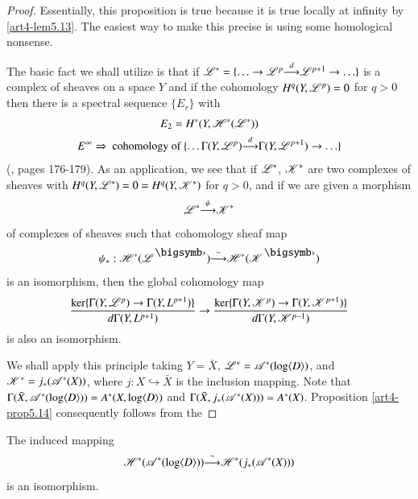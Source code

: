 \begin{proof}
Essentially, this proposition is true because it is true locally at infinity by  \eqref{art4-lem5.13}. The easiest way to make this precise is using some homological nonsense.

The basic fact we shall utilize is that if $\mathscr{L}^\ast = \{\ldots \to \mathscr{L}^p {\displaystyle{\mathop{\longrightarrow}^d}} \mathscr{L}^{p+1} \to \ldots \}$ is a complex of sheaves on a space $Y$ and if the cohomology $H^q (Y, \mathscr{L}^p) =0$ for $q > 0$ then there is a spectral sequence $\{E_r\}$ with 
\begin{gather*}
E_2 = H^\ast (Y, \mathscr{H}^\ast (\mathscr{L}^\ast))\\
E^\infty \Rightarrow \text{ cohomology of } \{\ldots \Gamma (Y, \mathscr{L}^p) {\displaystyle{\mathop{\longrightarrow}^{d}}} \Gamma (Y, \mathscr{L}^{p+1}) \to \ldots  \}
\end{gather*}\pageoriginale
(\cf \cite{art4-key17}, pages 176-179). As an application, we see that if $\mathscr{L}^\ast$, $\mathscr{K}^\ast$ are two complexes of sheaves with $H^q (Y, \mathscr{L}^\ast) = 0 = H^q (Y, \mathscr{K}^\ast)$ for $q >0$, and if we are given a morphism
$$
\mathscr{L}^\ast {\displaystyle{\mathop{\longrightarrow}^{\psi}}} \mathscr{K}^\ast
$$
of complexes of sheaves such that cohomology sheaf map
$$
\psi_\ast : \sH^\ast (\sL^\bigdot) {\displaystyle{\mathop{\longrightarrow}^{\sim}}} \sH^\ast (\sK^\bigdot)
$$
is an isomorphism, then the global cohomology map
$$
\frac{\ker \{\Gamma (Y, \mathscr{L}^p) \to \Gamma (Y, L^{p+1})\}}{d \Gamma (Y, L^{p+1})} \to \frac{\ker \{\Gamma (Y, \mathscr{K}^p) \to \Gamma (Y, \mathscr{K}^{p+1})\}}{d\Gamma (Y, \mathscr{K}^{p-1})}
$$
is also an isomorphism.

We shall apply this principle taking $Y =\bar{X}$, $\mathscr{L}^\ast = \mathscr{A}^\ast (\log \langle D \rangle)$, and $\mathscr{K}^\ast = j_\ast (\mathscr{A}^\ast (X))$, where $j:X \hookrightarrow\bar{X}$ is the inclusion mapping. Note that $\Gamma (\bar{X}, \mathscr{A}^\ast (\log \langle D \rangle)) = A^\ast (X, \log \langle D\rangle)$  and $\Gamma (\bar{X}, j_\ast (\mathscr{A}^\ast (X))) = A^\ast (X)$. Proposition \ref{art4-prop5.14} consequently follows from the
\end{proof}

\begin{lemma*}
The induced mapping
$$
\mathscr{H}^\ast (\mathscr{A}^{\ast} (\log \langle D \rangle)) {\displaystyle{\mathop{\longrightarrow}^{\sim}}} \mathscr{H}^{\ast} (j_\ast (\mathscr{A}^\ast (X)))
$$
is an isomorphism.
\end{lemma*}

